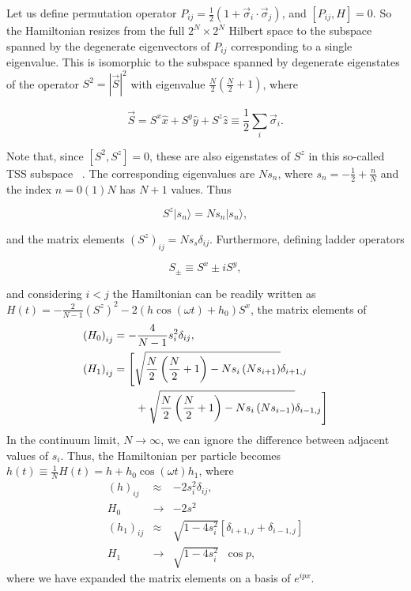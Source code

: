 \documentclass[%
 reprint,
superscriptaddress,
 amsmath,amssymb,
 aps,
prb,
]{revtex4-2}
\begin{document}
Let us define permutation operator $P_{ij} = \displaystyle\frac{1}{2}\left(1+ \vec{\sigma}_i\cdot\vec{\sigma}_j\right)$,
and $[P_{ij}, H]=0$. So the Hamiltonian resizes from the full $2^N\times 2^N$ Hilbert space to the subspace spanned by the degenerate eigenvectors of $P_{ij}$ corresponding to a single eigenvalue.
This is isomorphic to the subspace spanned by degenerate eigenstates of the operator $S^2=|\vec{S}|^2$ with eigenvalue $\displaystyle\frac{N}{2}\left(\frac{N}{2}+1\right)$, where

\begin{equation}
	\vec{S}=S^x\hat{x}+S^y\hat{y}+S^z\hat{z}\equiv\frac12 \sum_i \vec{\sigma}_i.
\end{equation}

Note that, since $[S^2, S^z]=0$, these are also eigenstates of $S^z$ in this so-called TSS subspace ~\cite{mori_prethermalization_2019}. The corresponding eigenvalues are $Ns_n$, where $s_n=-\frac{1}{2}+\frac{n}{N}$ and the index
$n= 0 (1) N$ has $N+1$ values. Thus

\begin{equation}
	S^z |s_n\rangle = Ns_n|s_n\rangle,
\end{equation}

and the matrix elements $(S^z)_{ij} = Ns_s\delta_{ij}$. Furthermore, defining ladder operators

\begin{equation}
	S_\pm \equiv S^x \pm i S^y,
\end{equation}

and considering $i<j$ the Hamiltonian can be readily written as
$H(t) = -\displaystyle\frac{2}{N-1}(S^z)^2 - 2(h \cos{(\omega t )} + h_0)S^x$, the matrix elements of
\begin{align}
	\left(H_0\right)_{ij} &= -\frac{4}{N-1} s^2_i \delta_{ij},\nonumber\\
	\left(H_1\right)_{ij} &= \Bigg[\sqrt{\frac{N}{2}\left(\frac{N}{2}+1\right) - Ns_i\left(Ns_{i + 1}\right)}\delta_{i+1, j} \nonumber\\ 
	&\hskip 0.7cm +\sqrt{\frac{N}{2}\left(\frac{N}{2}+1\right) - Ns_i\left(Ns_{i- 1}\right)}\delta_{i-1,j}\Bigg]
\end{align}
In the continuum limit, $N\rightarrow\infty$, we can ignore the difference between adjacent values
of $s_i$. Thus, the Hamiltonian per particle becomes $h(t)\equiv \displaystyle\frac{1}{N}H(t) = h + h_0\cos{(\omega t)}h_1$, where
\begin{eqnarray}
	\left(h\right)_{ij} &\approx& - 2s^2_i \delta_{ij},\nonumber\\
	H_0 &\rightarrow& -2s^2\\
	\left(h_1\right)_{ij} &\approx& \sqrt{1 - 4s^2_i}\left[\delta_{i+1, j}  + \delta_{i-1,j}\right]\nonumber\\
	H_1 &\rightarrow& \sqrt{1 - 4s^2_i}\;\;\cos{p},
\end{eqnarray}
where we have expanded the matrix elements on a basis of $e^{ipx}$.
\end{document}

